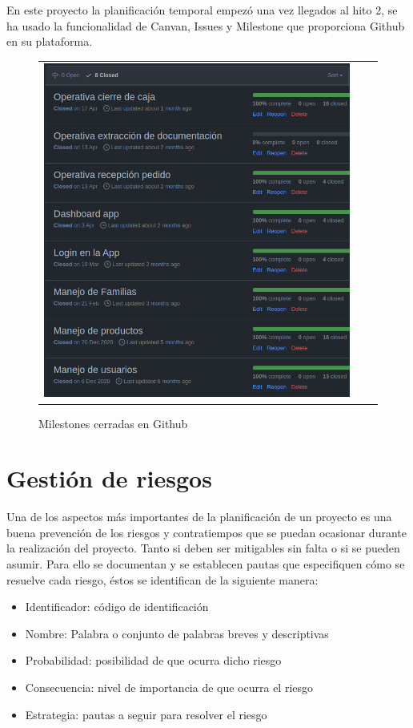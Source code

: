 \vspace{1em}
\par En este proyecto la planificación temporal empezó una vez llegados al hito 2, se ha usado la funcionalidad de Canvan, Issues y Milestone que proporciona Github en su plataforma.
\begin{figure}[h]
\centering
\begin{tabular}{ccc}
\includegraphics[scale=0.62]{archivos/github_milestones.png}
\end{tabular}
\caption{Milestones cerradas en Github}
\label{fig:github_milestones}
\end{figure}
\clearpage
\section{Gestión de riesgos}
Una de los aspectos más importantes de la planificación de un proyecto es una buena prevención de los riesgos y contratiempos que se puedan ocasionar durante la realización del proyecto. Tanto si deben ser mitigables sin falta o si se pueden asumir. Para ello se documentan y se establecen pautas que especifiquen cómo se resuelve cada riesgo, éstos se identifican de la siguiente manera:
\begin{itemize}
    \item Identificador: código de identificación
    \item Nombre: Palabra o conjunto de palabras breves y descriptivas
    \item Probabilidad: posibilidad de que ocurra dicho riesgo
    \item Consecuencia: nivel de importancia de que ocurra el riesgo
    \item Estrategia: pautas a seguir para resolver el riesgo
\end{itemize}

